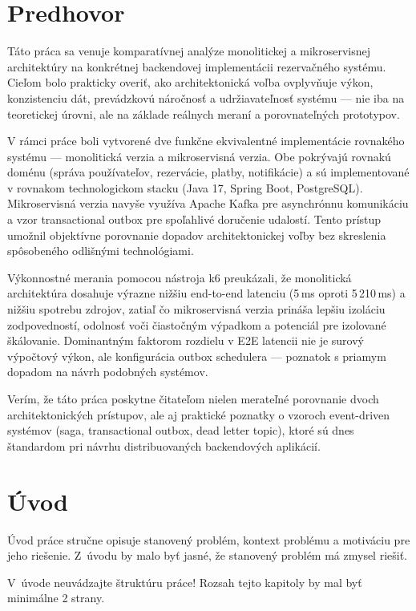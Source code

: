 \section*{Predhovor}

Táto práca sa venuje komparatívnej analýze monolitickej a mikroservisnej architektúry na konkrétnej backendovej implementácii rezervačného systému. Cieľom bolo prakticky overiť, ako architektonická voľba ovplyvňuje výkon, konzistenciu dát, prevádzkovú náročnosť a udržiavateľnosť systému — nie iba na teoretickej úrovni, ale na základe reálnych meraní a porovnateľných prototypov.

V rámci práce boli vytvorené dve funkčne ekvivalentné implementácie rovnakého systému — monolitická verzia a mikroservisná verzia. Obe pokrývajú rovnakú doménu (správa používateľov, rezervácie, platby, notifikácie) a sú implementované v rovnakom technologickom stacku (Java 17, Spring Boot, PostgreSQL). Mikroservisná verzia navyše využíva Apache Kafka pre asynchrónnu komunikáciu a vzor transactional outbox pre spoľahlivé doručenie udalostí. Tento prístup umožnil objektívne porovnanie dopadov architektonickej voľby bez skreslenia spôsobeného odlišnými technológiami.

Výkonnostné merania pomocou nástroja k6 preukázali, že monolitická architektúra dosahuje výrazne nižšiu end-to-end latenciu (5\,ms oproti 5\,210\,ms) a nižšiu spotrebu zdrojov, zatiaľ čo mikroservisná verzia prináša lepšiu izoláciu zodpovedností, odolnosť voči čiastočným výpadkom a potenciál pre izolované škálovanie. Dominantným faktorom rozdielu v E2E latencii nie je surový výpočtový výkon, ale konfigurácia outbox schedulera — poznatok s priamym dopadom na návrh podobných systémov.

Verím, že táto práca poskytne čitateľom nielen merateľné porovnanie dvoch architektonických prístupov, ale aj praktické poznatky o vzoroch event-driven systémov (saga, transactional outbox, dead letter topic), ktoré sú dnes štandardom pri návrhu distribuovaných backendových aplikácií.


\section*{Úvod}

Úvod práce stručne opisuje stanovený problém, kontext problému a motiváciu pre jeho riešenie. Z~úvodu by malo byť jasné, že stanovený problém má zmysel riešiť.

V~úvode neuvádzajte štruktúru práce! Rozsah tejto kapitoly by mal byť minimálne 2 strany.

